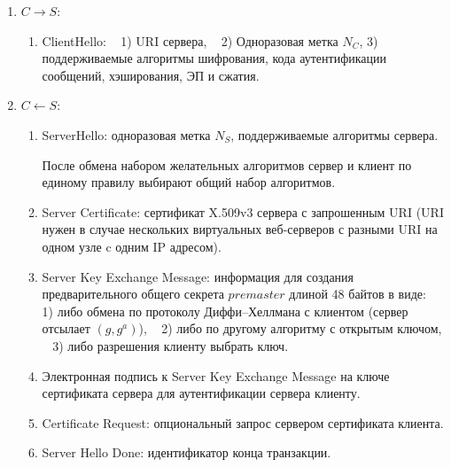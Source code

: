 \begin{enumerate}
    \item $C \rightarrow S$:
        \begin{enumerate}
            \item ClientHello: ~ 1) URI сервера, ~ 2) Одноразовая метка $N_C$, 3) ~ поддерживаемые алгоритмы шифрования, кода аутентификации сообщений, хэширования, ЭП и сжатия.
        \end{enumerate}

    \item $C \leftarrow S$:
        \begin{enumerate}
            \item ServerHello: одноразовая метка $N_S$, поддерживаемые алгоритмы сервера.

            После обмена набором желательных алгоритмов сервер и клиент по единому правилу выбирают общий набор алгоритмов.
            \item Server Certificate: сертификат X.509v3 сервера с запрошенным URI (URI нужен в случае нескольких виртуальных веб-серверов с разными URI на одном узле c одним IP адресом).
            \item Server Key Exchange Message: информация для создания предварительного общего секрета $premaster$ длиной 48 байтов в виде: ~ 1) либо обмена по протоколу Диффи--Хеллмана с клиентом (сервер отсылает $(g, g^a)$), ~ 2) либо по другому алгоритму с открытым ключом, ~ 3) либо разрешения клиенту выбрать ключ.
            \item Электронная подпись к Server Key Exchange Message на ключе сертификата сервера для аутентификации сервера клиенту.
            \item Certificate Request: опциональный запрос сервером сертификата клиента.
            \item Server Hello Done: идентификатор конца транзакции.
        \end{enumerate}


\end{enumerate}

